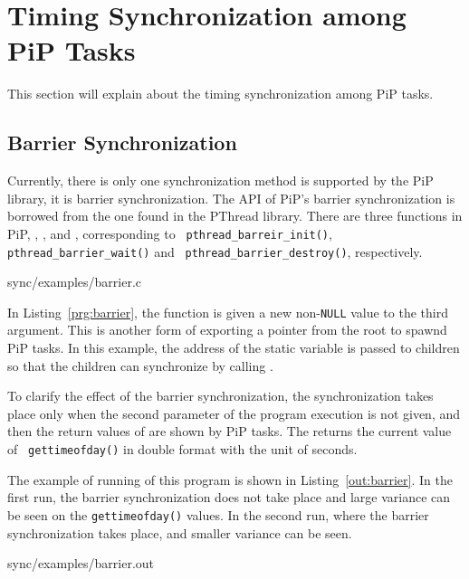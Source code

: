 
\section{Timing Synchronization among PiP Tasks}

This section will explain about the timing synchronization among PiP
tasks.

\subsection{Barrier Synchronization}

Currently, there is only one synchronization method is supported by
the PiP library, it is barrier synchronization. The API of PiP's
barrier synchronization is borrowed from the one found in the PThread
library. There are three functions in PiP,
, , and
  , corresponding to {\tt
    pthread_barreir_init()}, {\tt pthread_barrier_wait()} and {\tt
        pthread_barrier_destroy()}, respectively. 

 {sync/examples/barrier.c}

In Listing~\ref{prg:barrier}, the  function is
given a new non-{\tt NULL} value to the third argument. This is
another form of exporting a pointer from the root to spawnd PiP
tasks. In this example, the address of the 
static variable is passed to children so that the children can
synchronize by calling .

To clarify the effect of the barrier synchronization, the
synchronization takes place only when the second parameter of the
program execution is not given, and then the return values of
 are shown by PiP tasks. The
 returns the current value of {\tt
  gettimeofday()} in double format with the unit of seconds.

The example of running of this program is shown in
Listing~\ref{out:barrier}. In the first run, the barrier
synchronization does not take place and large variance can be seen on
the {\tt gettimeofday()} values. In the second run, where the barrier
synchronization takes place, and smaller variance can be seen.

 {sync/examples/barrier.out}


